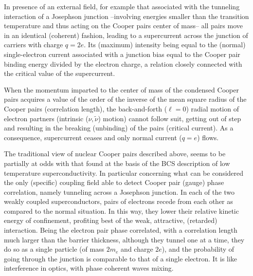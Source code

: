 In presence of an external field, for example that associated with the tunneling interaction of a Josephson junction --involving energies smaller than the transition temperature and thus acting on the Cooper pairs center of mass-- all pairs move  in an identical (coherent) fashion, leading to a supercurrent across the junction of carriers with charge $q=2e$. Its (maximum) intensity being equal to the (normal) single-electron current associated with a junction bias equal to the Cooper pair binding energy divided by the electron charge, a relation closely connected with the critical value of the supercurrent.

When the momentum imparted to the center of mass of the condensed Cooper pairs acquires a value of the order of the inverse of the mean square radius of the Cooper pairs (correlation length), the back-and-forth ($\ell=0$) radial motion of electron partners (intrinsic ($\nu,\tilde \nu$) motion) cannot follow suit, getting out of step and resulting in the breaking (unbinding) of the pairs (critical current). As a consequence, supercurrent ceases and only normal current ($q=e$) flows.

The traditional view of nuclear Cooper pairs described above, seems to be partially at odds with that found at the basis of the BCS description of low temperature superconductivity. In particular concerning what can be considered the only (specific) coupling field able to detect Cooper pair (gauge) phase correlation, namely tunneling across a Josephson junction. In each of the two weakly coupled superconductors, pairs of electrons recede from each other  as compared to the normal situation. In this way, they lower their relative kinetic energy of confinement, profiting best of the weak, attractive, (retarded) interaction. Being the electron pair phase correlated, with a correlation length much larger than the barrier thickness, although they tunnel one at a time, they do so as a single particle (of mass $2m_e$ and charge $2e$), and the probability of going through the junction is comparable to that of a single electron. It is like interference in optics, with phase coherent waves mixing.

